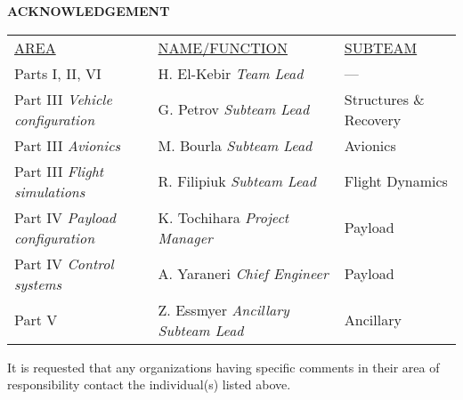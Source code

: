 
\begin{center}
	{\Large\textbf{ACKNOWLEDGEMENT}}\\
	\begin{minipage}[H]{0.75\linewidth}
		\begin{table}[H]
			\begin{tabularx}{\linewidth}{X X l}
				\underline{AREA} & \underline{NAME/FUNCTION} & \underline{SUBTEAM} \\[.75em]
				Parts I, II, VI & H. El-Kebir \newline \textit{Team Lead} & --- \\[1.5em]
				Part III \newline \textit{Vehicle configuration} & G. Petrov \newline \textit{Subteam Lead} & Structures \& Recovery \\[1.5em]
				Part III  \newline \textit{Avionics} & M. Bourla \newline \textit{Subteam Lead} & Avionics \\[1.5em]
				Part III  \newline \textit{Flight simulations} & R. Filipiuk \newline \textit{Subteam Lead} & Flight Dynamics \\[1.5em]
				Part IV \newline \textit{Payload configuration} & K. Tochihara \newline \textit{Project Manager} & Payload \\[1.5em]
				Part IV \newline \textit{Control systems} & A. Yaraneri \newline \textit{Chief Engineer} & Payload \\[1.5em]
				Part V & Z. Essmyer \newline \textit{Ancillary Subteam Lead} & Ancillary
			\end{tabularx}
		\end{table}
	
	
		It is requested that any organizations having specific comments in their area of responsibility contact the individual(s) listed above.
	\end{minipage}
\end{center}
\vfill

\newpage